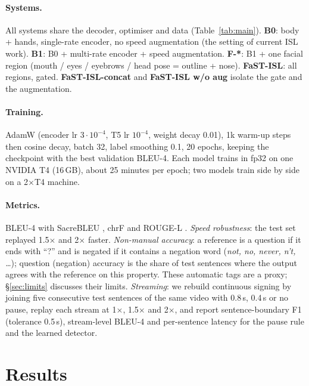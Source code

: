 \documentclass[11pt]{article}
\newcommand{\fast}{FaST-ISL}
\begin{document}
\paragraph{Systems.} All systems share the decoder, optimiser and data (Table~\ref{tab:main}).
\textbf{B0}: body + hands, single-rate encoder, no speed augmentation (the setting of current ISL
work). \textbf{B1}: B0 + multi-rate encoder + speed augmentation. \textbf{F-*}: B1 + one facial region
(mouth / eyes / eyebrows / head pose = outline + nose). \textbf{\fast}: all regions, gated.
\textbf{\fast-concat} and \textbf{\fast{} w/o aug} isolate the gate and the augmentation.

\paragraph{Training.} AdamW (encoder lr $3{\cdot}10^{-4}$, T5 lr $10^{-4}$, weight decay 0.01), 1k
warm-up steps then cosine decay, batch 32, label smoothing 0.1, 20 epochs, keeping the checkpoint with
the best validation BLEU-4. Each model trains in fp32 on one NVIDIA T4 (16\,GB), about 25 minutes per
epoch; two models train side by side on a 2$\times$T4 machine.

\paragraph{Metrics.} BLEU-4 \citep{papineni2002bleu} with SacreBLEU \citep{post2018sacrebleu}, chrF
\citep{popovic2015chrf} and ROUGE-L \citep{lin2004rouge}. \emph{Speed robustness}: the test set
replayed 1.5$\times$ and 2$\times$ faster. \emph{Non-manual accuracy}: a reference is a question if it
ends with ``?'' and is negated if it contains a negation word (\emph{not, no, never, n't, \ldots});
question (negation) accuracy is the share of test sentences where the output agrees with the reference
on this property. These automatic tags are a proxy; \S\ref{sec:limits} discusses their limits.
\emph{Streaming}: we rebuild continuous signing by joining five consecutive test sentences of the same
video with 0.8\,s, 0.4\,s or no pause, replay each stream at 1$\times$, 1.5$\times$ and 2$\times$, and
report sentence-boundary F1 (tolerance 0.5\,s), stream-level BLEU-4 and per-sentence latency for the pause
rule and the learned detector.

\section{Results}
\end{document}
